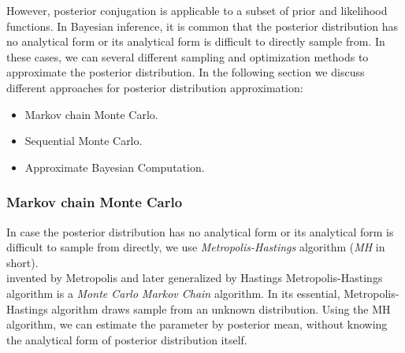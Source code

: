 However, posterior conjugation is applicable to a subset of prior and likelihood functions. In
Bayesian inference, it is common that the posterior distribution has no analytical form or its
analytical form is difficult to directly sample from. In these cases, we can several different
sampling and optimization methods to approximate the posterior distribution. In the following
section we discuss different approaches for posterior distribution approximation:
\begin{itemize}
    \item Markov chain Monte Carlo.
    \item Sequential Monte Carlo.
    \item Approximate Bayesian Computation.
\end{itemize}

\subsubsection{Markov chain Monte Carlo}
In case the posterior distribution has no analytical form or its analytical form is difficult to
sample from directly, we use \textit{Metropolis-Hastings} algorithm  (\textit{MH} in short).\\
invented by Metropolis \cite{metropolis1953equation} and later generalized by Hastings \cite{hastings1970monte}
Metropolis-Hastings algorithm is a \textit{Monte Carlo Markov Chain} algorithm. In its essential,
Metropolis-Hastings algorithm draws sample from an unknown distribution. Using the MH algorithm, we
can estimate the parameter by posterior mean, without knowing the analytical form of posterior
distribution itself.

